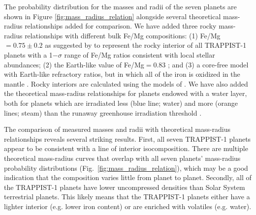 \documentclass[fleqn,usenatbib]{mnras} %
\begin{document}
The probability distribution for the masses and radii of the seven planets are shown in Figure \ref{fig:mass_radius_relation} alongside several theoretical mass-radius relationships added for comparison. 
We have added three rocky mass-radius relationships with different bulk Fe/Mg compositions:  (1) Fe/Mg$ =0.75{\pm} 0.2$ as suggested by \citet{Unterborn2018a} to represent the rocky interior of all TRAPPIST-1 planets with a 1$-\sigma$ range of Fe/Mg ratios consistent with local stellar abundances;  (2) the Earth-like value of Fe/Mg$ = 0.83$ \citep{Lodders2009}; and (3) a core-free model with Earth-like refractory ratios, but in which all of the iron is oxidized in the mantle \citep{ElkinsTanton2008}. Rocky interiors are calculated using the models of \citet{Dorn2016}. We have also added the theoretical mass-radius relationships for planets endowed with a water layer, both for planets which are irradiated less (blue line; water) and more (orange lines; steam) than the runaway greenhouse irradiation threshold \citep{Turbet2020}.

The comparison of measured masses and radii with theoretical mass-radius relationships reveals several striking results. First, all seven TRAPPIST-1 planets appear to be consistent with a line of interior isocomposition. There are multiple theoretical mass-radius curves that overlap with all seven planets' mass-radius probability distributions (Fig.\ \ref{fig:mass_radius_relation}), which may be a good indication that the composition varies little from planet to planet. Secondly, all of the TRAPPIST-1 planets have lower uncompressed densities than Solar System terrestrial planets. This likely means that the TRAPPIST-1 planets either have a lighter interior (e.g. lower iron content) or are enriched with volatiles (e.g. water).
\end{document}
